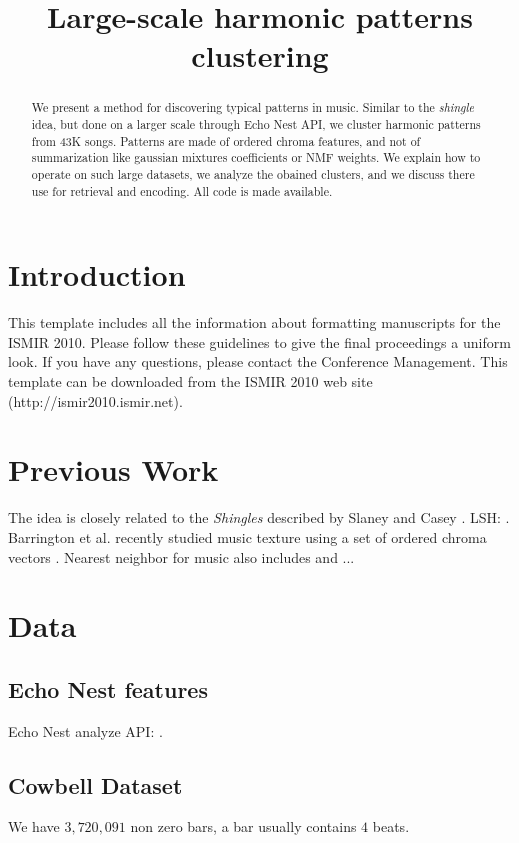 \documentclass{article}
\title{Large-scale harmonic patterns clustering}
\begin{document}
%
\maketitle
%
\begin{abstract}
We present a method for discovering typical patterns in music.
Similar to the \textit{shingle} idea, but done on a larger scale through
Echo Nest API, we cluster harmonic patterns from 43K songs. Patterns are
made of ordered chroma features, and not of summarization like gaussian
mixtures coefficients or NMF weights. We explain
how to operate on such large datasets, we analyze the obained clusters,
and we discuss there use for retrieval and encoding. All code is made
available.
\end{abstract}
%
\section{Introduction}\label{sec:introduction}

This template includes all the information about formatting manuscripts for the ISMIR 2010. 
Please follow these guidelines to give the final proceedings a uniform look. 
If you have any questions, please contact the Conference Management.
This template can be downloaded from the ISMIR 2010 web site (http://ismir2010.ismir.net).


\section{Previous Work}\label{sec:prevwork}
The idea is closely related to the \textit{Shingles} described by
Slaney and Casey \cite{Casey2006,Casey2007,Casey2008}. LSH: \cite{E2LSH}.
Barrington et al. recently studied music texture using a set of ordered
chroma vectors \cite{Barrington2009a}. 
Nearest neighbor for music also includes \cite{Cano2004} and ...


\section{Data}\label{sec:data}

\subsection{Echo Nest features}
Echo Nest analyze API: \cite{EchoNest}.

\subsection{Cowbell Dataset}
We have $3,720,091$ non zero bars, a bar usually contains
$4$ beats.
\end{document}
